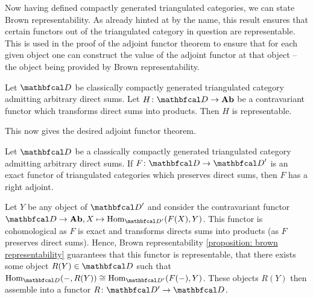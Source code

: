 Now having defined compactly generated triangulated categories, we can state Brown representability. As already hinted at by the name, this result ensures that certain functors out of the triangulated category in question are representable. This is used in the proof of the adjoint functor theorem to ensure that for each given object one can construct the value of the adjoint functor at that object -- the object being provided by Brown representability. 
\begin{proposition}
	\label{proposition: brown representability}
	
	Let $\category{D}$ be classically compactly generated triangulated category admitting arbitrary direct sums. Let $H\colon \category{D}\to \Ab$ be a contravariant functor which transforms direct sums into products. Then $H$ is representable.
\end{proposition}

This now gives the desired adjoint functor theorem.
\begin{theorem}
	\label{theorem: an adjoint functor theorem via brown representability}
	
	Let $\category{D}$ be a classically compactly generated triangulated category admitting arbitrary direct sums. If $F\colon \category D \to \category D'$ is an exact functor of triangulated categories which preserves direct sums, then $F$ has a right adjoint.
\end{theorem}
\begin{proofsketch}
	
	Let $Y$ be any object of $\category{D}'$ and consider the contravariant functor $\category{D}\to \Ab, X\mapsto \Hom_{\category{D'}}(F(X), Y)$. This functor is cohomological as $F$ is exact and transforms directs sums into products (as $F$ preserves direct sums). Hence, Brown representability \ref{proposition: brown representability} guarantees that this functor is representable, \ie that there exists some object $R(Y)\in\category{D}$ such that $\Hom_\category{D}(-, R(Y)) \cong \Hom_{\category{D'}}(F(-), Y)$. These objects $R(Y)$ then assemble into a functor $R\colon \category{D'}\to \category{D}$.
\end{proofsketch}

